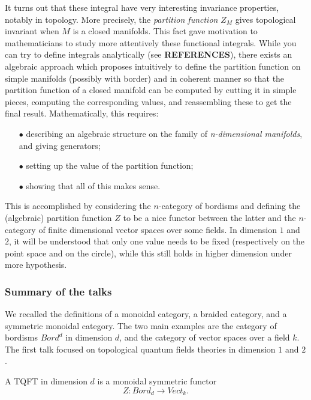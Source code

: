 It turns out that these integral have very interesting invariance properties, notably in topology. More precisely, the \textit{partition function} $Z_M$ gives topological invariant when $M$ is a closed manifolds. This fact gave motivation to mathematicians to study more attentively these functional integrals. While you can try to define integrals analytically (see \textbf{REFERENCES}), there exists an algebraic approach which proposes intuitively to define the partition function on simple manifolds (possibly with border) and in coherent manner so that the partition function of a closed manifold can be computed by cutting it in simple pieces, computing the corresponding values, and reassembling these to get the final result. Mathematically, this requires: 
\begin{itemize}
\item[$\bullet$] describing an algebraic structure on the family of \textit{n-dimensional manifolds}, and giving generators;
\item[$\bullet$] setting up the value of the partition function;
\item[$\bullet$] showing that all of this makes sense.
\end{itemize}
This is accomplished by considering the $n$-category of bordisms and defining the (algebraic) partition function $Z$ to be a nice functor between the latter and the $n$-category of finite dimensional vector spaces over some fields. In dimension $1$ and $2$, it will be understood that only one value needs to be fixed (respectively on the point space and on the circle), while this still holds in higher dimension under more hypothesis.

\subsubsection{Summary of the talks}

We recalled the definitions of a monoidal category, a braided category, and a symmetric monoidal category. The two main examples are the category of bordisms $Bord^d$ in dimension $d$, and the category of vector spaces over a field $k$. The first talk focused on topological quantum fields theories in dimension $1$ and $2$.

\begin{definition} A TQFT in dimension $d$ is a monoidal symmetric functor
\[Z : Bord_d \rightarrow Vect_k.\] 
\end{definition}

